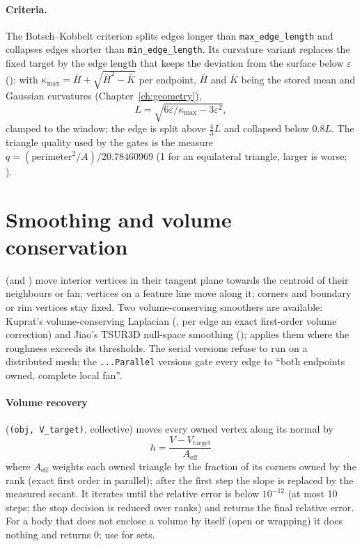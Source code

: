 \paragraph{Criteria.} The Botsch--Kobbelt criterion splits edges longer than
\texttt{max\_edge\_length} and collapses edges shorter than \texttt{min\_edge\_length}. Its
curvature variant replaces the fixed target by the edge length that keeps the deviation from
the surface below $\varepsilon$ (): with
$\kappa_{\max}=\bar H+\sqrt{\bar H^2-\bar K}$ per endpoint, $\bar H$ and $\bar K$ being the stored
mean and Gaussian curvatures (Chapter~\ref{ch:geometry}),
\begin{equation}
  L = \sqrt{6\varepsilon/\kappa_{\max}-3\varepsilon^2},
\end{equation}
clamped to the window; the edge is split above $\tfrac43L$ and collapsed below $0.8L$. The
triangle quality used by the gates is the \mftlone{} measure
$q=(\text{perimeter}^2/A)/20.78460969$ (1 for an equilateral triangle, larger is worse;
).

\section{Smoothing and volume conservation}
\label{sec:volume-recovery}

 (and ) move interior vertices in
their tangent plane towards the centroid of their neighbours or fan; vertices on a feature line
move along it; corners and boundary or rim vertices stay fixed. Two volume-conserving smoothers
are available: Kuprat's volume-conserving Laplacian (, per edge
an exact first-order volume correction) and Jiao's TSUR3D null-space smoothing
();  applies them where the roughness exceeds its
thresholds. The serial versions refuse to run on a distributed mesh; the \texttt{...Parallel}
versions gate every edge to ``both endpoints owned, complete local fan''.

\paragraph{Volume recovery} (\texttt{(obj, V\_target)}, collective) moves every
owned vertex along its normal by
\begin{equation}
  h = \frac{V-V_{\text{target}}}{A_{\text{eff}}}
\end{equation}
where $A_{\text{eff}}$ weights each owned triangle by the fraction of its corners owned by the rank
(exact first order in parallel); after the first step the slope is replaced by the measured
secant. It iterates until the relative error is below $10^{-12}$ (at most 10 steps; the stop
decision is reduced over ranks) and returns the final relative error. For a body that does not
enclose a volume by itself (open or wrapping) it does nothing and returns 0; use
 for sets.

